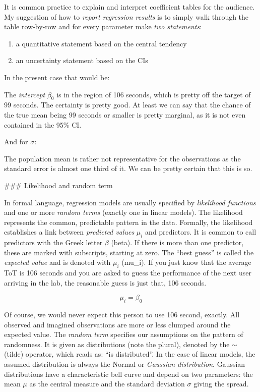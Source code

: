 \documentclass[]{svmono}
\providecommand{\tightlist}{%
  \setlength{\itemsep}{0pt}\setlength{\parskip}{0pt}}
\begin{document}
It is common practice to explain and interpret coefficient tables for
the audience. My suggestion of how to \emph{report regression results}
is to simply walk through the table row-by-row and for every parameter
make \emph{two statements}:

\begin{enumerate}
\def\labelenumi{\arabic{enumi}.}
\tightlist
\item
  a quantitative statement based on the central tendency
\item
  an uncertainty statement based on the CIs
\end{enumerate}

In the present case that would be:

The \emph{intercept} \(\beta_0\) is in the region of 106 seconds, which
is pretty off the target of 99 seconds. The certainty is pretty good. At
least we can say that the chance of the true mean being 99 seconds or
smaller is pretty marginal, as it is not even contained in the 95\% CI.

And for \(\sigma\):

The population mean is rather not representative for the observations as
the standard error is almost one third of it. We can be pretty certain
that this is so.

 \#\#\# Likelihood and random term

In formal language, regression models are usually specified by
\emph{likelihood functions} and one or more \emph{random terms} (exactly
one in linear models). The likelihood represents the common, predictable
pattern in the data. Formally, the likelihood establishes a link between
\emph{predicted values} \(\mu_i\) and predictors. It is common to call
predictors with the Greek letter \(\beta\) (beta). If there is more than
one predictor, these are marked with subscripts, starting at zero. The
``best guess'' is called the \emph{expected value} and is denoted with
\(\mu_i\) (mu\_i). If you just know that the average ToT is 106 seconds
and you are asked to guess the performance of the next user arriving in
the lab, the reasonable guess is just that, 106 seconds.

\[\mu_i = \beta_0\]

Of course, we would never expect this person to use 106 second, exactly.
All observed and imagined observations are more or less clumped around
the expected value. The \emph{random term} specifies our assumptions on
the pattern of randomness. It is given as distributions (note the
plural), denoted by the \(\sim\) (tilde) operator, which reads as: ``is
distributed''. In the case of linear models, the assumed distribution is
always the Normal or \emph{Gaussian distribution}. Gaussian
distributions have a characteristic bell curve and depend on two
parameters: the mean \(\mu\) as the central measure and the standard
deviation \(\sigma\) giving the spread.
\end{document}
